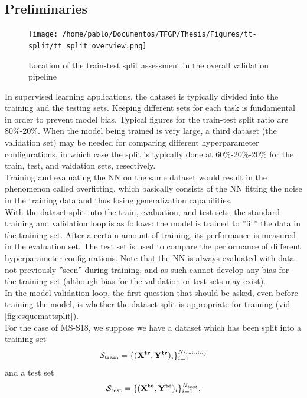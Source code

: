 \subsection{Preliminaries}
\begin{figure}[!b]
	\centering
	\texttt{[image: /home/pablo/Documentos/TFGP/Thesis/Figures/tt-split/tt\_split\_overview.png]}
	\caption{Location of the train-test split assessment in the overall validation pipeline}
	\label{fig:esquemattsplit}
\end{figure}
\indent In supervised learning applications, the dataset is typically divided into the training and the testing sets. Keeping different sets for each task is fundamental in order to prevent model bias. Typical figures for the train-test split ratio are 80\%-20\%. When the model being trained is very large, a third dataset (the validation set) may be needed for comparing different hyperparameter configurations, in which case the split is typically done at 60\%-20\%-20\% for the train, test, and vaidation sets, resectively\cite[pp. 20-21]{Marsland2015Machine}.\\
%
\indent Training and evaluating the NN on the same dataset would result in the phenomenon called overfitting\cite[pp. 19-20]{Marsland2015Machine}, which basically consists of the NN fitting the noise in the training data and thus losing generalization capabilities.\\
%
\indent With the dataset split into the train, evaluation, and test sets, the standard training and validation loop is as follows: the model is trained to ''fit'' the data in the training set. After a certain amount of training, its performance is measured in the evaluation set. The test set is used to compare the performance of different hyperparameter configurations. Note that the NN is always evaluated with data not previously ''seen'' during training, and as such cannot develop any bias for the training set (although bias for the validation or test sets may exist).\\
%
\indent In the model validation loop, the first question that should be asked, even before training the model, is whether the dataset split is appropriate for training (vid \autoref{fig:esquemattsplit}).\\
%
\indent For the case of MS-S18, we suppose we have a dataset which has been split into a training set
$${\cal S}_{\text{train}}=\{({\bf X^{tr}},{\bf Y^{tr}})_i\}_{i=1}^{N_{training}}$$
and a test set
$${\cal S}_{\text{test}}=\{({\bf X^{te}},{\bf Y^{te}})_i\}_{i=1}^{N_{test}},$$
